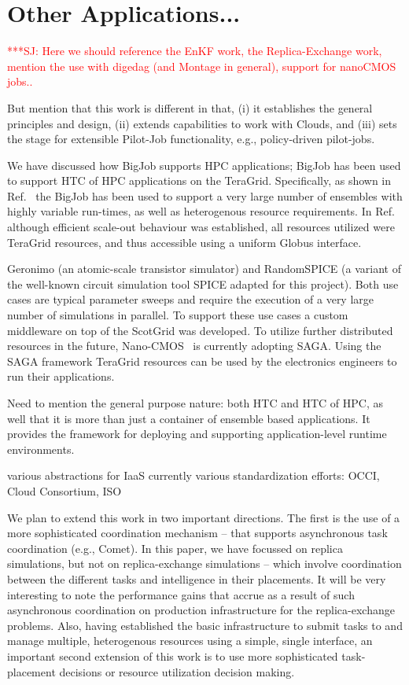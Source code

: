 \documentclass[conference,final]{IEEEtran}
\newcommand{\jhanote}[1]{ {\textcolor{red} { ***SJ: #1 }}}
\newcommand{\jhanote}[1]{}
\begin{document}
\section{Other Applications...}

\jhanote{Here we should reference the EnKF work, the Replica-Exchange
  work, mention the use with digedag (and Montage in general), support
  for nanoCMOS jobs..}

But mention that this work is different in that, (i) it establishes
the general principles and design, (ii) extends capabilities to work
with Clouds, and (iii) sets the stage for extensible Pilot-Job
functionality, e.g., policy-driven pilot-jobs.

We have discussed how BigJob supports HPC applications; BigJob has
been used to support HTC of HPC applications on the
TeraGrid. Specifically, as shown in Ref.~\cite{enkf-gmac09} the BigJob
has been used to support a very large number of ensembles with highly
variable run-times, as well as heterogenous resource requirements.  In
Ref.~\cite{enkf-gmac09} although efficient scale-out behaviour was
established, all resources utilized were TeraGrid resources, and thus
accessible using a uniform Globus interface. 

Geronimo (an atomic-scale transistor simulator) and RandomSPICE (a
variant of the well-known circuit simulation tool SPICE adapted for
this project). Both use cases are typical parameter sweeps and require
the execution of a very large number of simulations in parallel. To
support these use cases a custom middleware on top of the ScotGrid was
developed. To utilize further distributed resources in the future,
Nano-CMOS~\cite{nanocmos} is currently adopting SAGA. Using the SAGA
framework TeraGrid resources can be used by the electronics engineers
to run their applications.

Need to mention the general purpose nature: both HTC and HTC of HPC,
as well that it is more than just a container of ensemble based
applications.  It provides the framework for deploying and supporting
application-level runtime environments.


various abstractions for IaaS currently various standardization
efforts: OCCI, Cloud Consortium, ISO

We plan to extend this work in two important directions. The first is
the use of a more sophisticated coordination mechanism -- that
supports asynchronous task coordination (e.g., Comet). In this paper,
we have focussed on replica simulations, but not on replica-exchange
simulations -- which involve coordination between the different tasks
and intelligence in their placements.  It will be very interesting to
note the performance gains that accrue as a result of such
asynchronous coordination on production infrastructure for the
replica-exchange problems. Also, having established the basic
infrastructure to submit tasks to and manage multiple, heterogenous
resources using a simple, single interface, an important second
extension of this work is to use more sophisticated task-placement
decisions or resource utilization decision making.
\end{document}

